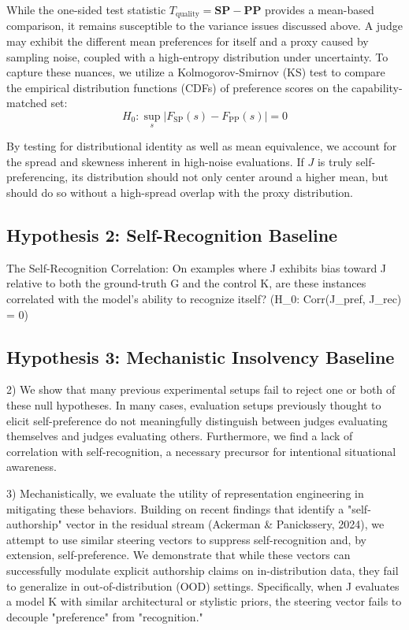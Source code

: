 \documentclass{article}
\theoremstyle{plain}
\theoremstyle{definition}
\theoremstyle{remark}
\begin{document}
While the one-sided test statistic $T_{\text{quality}} = \textbf{SP} - \textbf{PP}$ provides a mean-based comparison, it remains susceptible to the variance issues discussed above. A judge may exhibit the different mean preferences for itself and a proxy caused by sampling noise, coupled with a high-entropy distribution under uncertainty. To capture these nuances, we utilize a Kolmogorov-Smirnov (KS) test to compare the empirical distribution functions (CDFs) of preference scores on the capability-matched set:
\[ H_0: \sup_s |F_{\text{SP}}(s) - F_{\text{PP}}(s)| = 0 \]

By testing for distributional identity as well as mean equivalence, we account for the spread and skewness inherent in high-noise evaluations. If $J$ is truly self-preferencing, its distribution should not only center around a higher mean, but should do so without a high-spread overlap with the proxy distribution.

\subsection{Hypothesis 2: Self-Recognition Baseline}
The Self-Recognition Correlation: On examples where J exhibits bias toward J relative to both the ground-truth G and the control K, are these instances correlated with the model’s ability to recognize itself?
(H\_0: Corr(J\_pref, J\_rec) = 0)


\subsection{Hypothesis 3: Mechanistic Insolvency Baseline}
2) We show that many previous experimental setups fail to reject one or both of these null hypotheses. In many cases, evaluation setups previously thought to elicit self-preference do not meaningfully distinguish between judges evaluating themselves and judges evaluating others. Furthermore, we find a lack of correlation with self-recognition, a necessary precursor for intentional situational awareness.

3) Mechanistically, we evaluate the utility of representation engineering in mitigating these behaviors. Building on recent findings that identify a "self-authorship" vector in the residual stream (Ackerman \& Panickssery, 2024), we attempt to use similar steering vectors to suppress self-recognition and, by extension, self-preference. We demonstrate that while these vectors can successfully modulate explicit authorship claims on in-distribution data, they fail to generalize in out-of-distribution (OOD) settings. Specifically, when J evaluates a model K with similar architectural or stylistic priors, the steering vector fails to decouple "preference" from "recognition."
\end{document}
